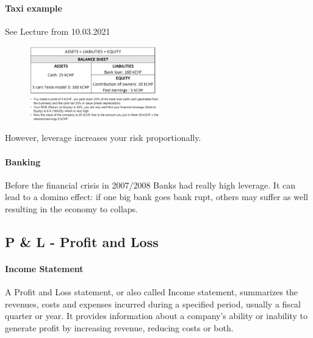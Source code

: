\paragraph{Taxi example} See Lecture from 10.03.2021

\begin{figure}[h]
    \centering
    \includegraphics[width=0.5\textwidth]{Pictures/Taxi_example.png}
\end{figure}

However, leverage increases your risk proportionally.

\paragraph{Banking}
Before the financial crisis in 2007/2008 Banks had really high leverage.
It can lead to a domino effect: if one big bank goes bank rupt, others may
suffer as well resulting in the economy to collaps.

\subsection{P \& L - Profit and Loss}

\paragraph{Income Statement}
A Profit and Loss statement, or also called Income statement, summarizes the
revenues, costs and expenses incurred during a specified period, usually a fiscal
quarter or year. It provides information about a company's ability or inability
to generate profit by increasing revenue, reducing costs or both.


